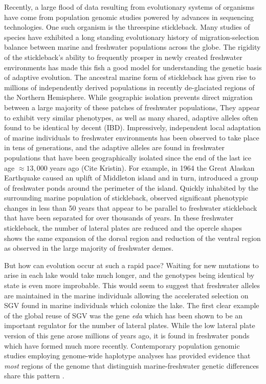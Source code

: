 \documentclass{article}
\begin{document}
Recently, a large flood of data resulting from evolutionary systems of organisms have come from population genomic studies powered by advances in sequencing technologies. 
One such organism is the threespine stickleback. 
Many studies of species have exhibited a long standing evolutionary history of migration-selection balance between marine and freshwater populations across the globe.
The rigidity of the stickleback's ability to frequently prosper in newly created freshwater environments has made this fish a good model for understanding the genetic basis of adaptive evolution. 
The ancestral marine form of stickleback has given rise to millions of independently derived populations in recently de-glaciated regions of the Northern Hemisphere.
While geographic isolation prevents direct migration between a large majority of these patches of freshwater populations,
They appear to exhibit very similar phenotypes, as well as many shared, adaptive alleles often found to be identical by decent (IBD). 
Impressively, independent local adaptation of marine individuals to freshwater environments has been observed to take place in tens of generations, 
and the adaptive alleles are found in freshwater populations that have been geographically isolated since the end of the last ice age $\approx 13,000$ years ago (Cite Kristin).
For example, in 1964 the Great Alaskan Earthquake caused an uplift of Middleton island and in turn, introduced a group of freshwater ponds around the perimeter of the island. 
Quickly inhabited by the surrounding marine population of stickleback, 
\citet{lescak2015evolution} observed significant phenotypic changes in less than 50 years that appear to be parallel to freshwater stickleback that have been separated for over thousands of years. 
In these freshwater stickleback, the number of lateral plates are reduced and the opercle shapes shows
the same expansion of the dorsal region and reduction of the ventral region as observed in the large majority of freshwater demes.

But how can evolution occur at such a rapid pace? 
Waiting for new mutations to arise in each lake would take much longer, and the genotypes being identical by state is even more improbable. 
This would seem to suggest that freshwater alleles are maintained in the marine individuals allowing the accelerated selection on SGV found in marine individuals which colonize the lake. 
The first clear example of the global reuse of SGV was the gene \textit{eda} which has been shown to be an important regulator for the number of lateral plates. 
While the low lateral plate version of this gene arose millions of years ago, it is found in freshwater ponds which have formed much more recently. 
Contemporary population genomic studies employing genome-wide haplotype analyses has provided evidence that \textit{most} regions of the genome that distinguish marine-freshwater genetic differences share this pattern \citep{nelson2017ancient}. 
 
\end{document}

